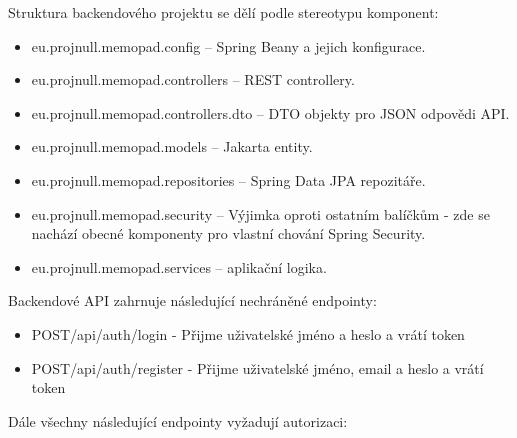 Struktura backendového projektu se dělí podle stereotypu komponent:

\begin{itemize}
    \item eu.projnull.memopad.config -- Spring Beany a jejich konfigurace.
    \item eu.projnull.memopad.controllers -- REST controllery.
    \item eu.projnull.memopad.controllers.dto -- DTO objekty pro JSON odpovědi API.
    \item eu.projnull.memopad.models -- Jakarta entity.
    \item eu.projnull.memopad.repositories -- Spring Data JPA repozitáře.
    \item eu.projnull.memopad.security -- Výjimka oproti ostatním balíčkům - zde se
          nachází obecné komponenty pro vlastní chování Spring Security.
    \item eu.projnull.memopad.services -- aplikační logika.
\end{itemize}

Backendové API zahrnuje následující nechráněné endpointy:

\begin{itemize}
    \item {\color{green} POST}/api/auth/login - Přijme uživatelské jméno a heslo a vrátí token
    \item {\color{green} POST}/api/auth/register - Přijme uživatelské jméno, email a heslo a vrátí token
\end{itemize}

Dále všechny následující endpointy vyžadují autorizaci:

